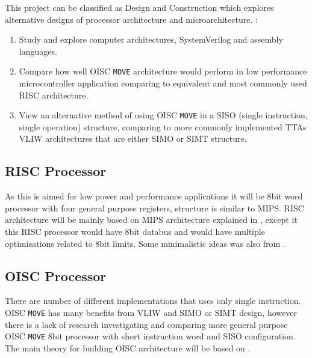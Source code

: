 \iffalse
This chapter describes your Goals and Objectives. 
Indicate how your work is intended to expand on previous historical work.
Present your motivations; why are you doing this?
Indicate the type of project you have(see the list above).

Types of Projects:
2) Design and Construction projects:
These types of projects involve the design and construction of some 
electrical or electronic apparatus or device within the bounds 
of the department's educational mandate.
\fi


This project can be classified as Design and Construction which explores alternative designs of processor architecture and microarchitecture. :
\begin{enumerate}
	\item Study and explore computer architectures, SystemVerilog and assembly languages. 
	\item Compare how well OISC \texttt{MOVE} architecture would perform in low performance microcontroller application comparing to equivalent and most commonly used RISC architecture.
	\item View an alternative method of using OISC \texttt{MOVE} in a SISO (single instruction, single operation) structure, comparing to more commonly implemented TTAs VLIW architectures that are either SIMO or SIMT structure.
\end{enumerate}


\subsection{RISC Processor}
As this is aimed for low power and performance applications it will be 8bit word processor with four general purpose registers, structure is similar to MIPS.
RISC architecture will be mainly based on MIPS architecture explained in \autocite{harris_harris_2013}, except it this RISC processor would have 8bit databus and would have multiple optimisations related to 8bit limits. Some minimalistic ideas was also from \autocite{gilreath_laplante_2003}.


\subsection{OISC Processor}
There are number of different implementations that uses only single instruction. OISC \texttt{MOVE} has many benefits from VLIW and SIMO or SIMT design, however there is a lack of research investigating and comparing more general purpose OISC \texttt{MOVE} 8bit processor with short instruction word and SISO configuration.  The main theory for building OISC architecture will be based on \autocite{gilreath_laplante_2003}.

